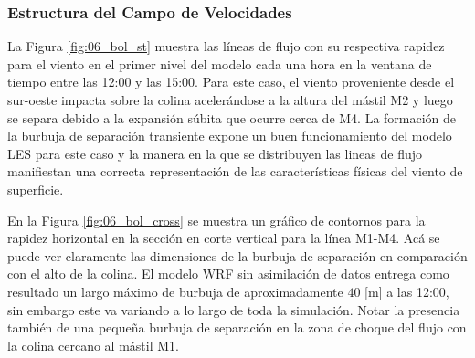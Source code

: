 \subsubsection{Estructura del Campo de Velocidades}
La Figura \ref{fig:06_bol_st} muestra las líneas de flujo con su respectiva rapidez para el viento en el primer nivel del modelo cada una hora en la ventana de tiempo entre las 12:00 y las 15:00. Para este caso, el viento proveniente desde el sur-oeste impacta sobre la colina acelerándose a la altura del mástil M2 y luego se separa debido a la expansión súbita que ocurre cerca de M4. La formación de la burbuja de separación transiente expone un buen funcionamiento del modelo LES para este caso y la manera en la que se distribuyen las lineas de flujo manifiestan una correcta representación de las características físicas del viento de superficie.

En la Figura \ref{fig:06_bol_cross} se muestra un gráfico de contornos para la rapidez horizontal en la sección en corte vertical para la línea M1-M4. Acá se puede ver claramente las dimensiones de la burbuja de separación en comparación con el alto de la colina. El modelo WRF sin asimilación de datos entrega como resultado un largo máximo de burbuja de aproximadamente $40$ [m] a las 12:00, sin embargo este va variando a lo largo de toda la simulación. Notar la presencia también de una pequeña burbuja de separación en la zona de choque del flujo con la colina cercano al mástil M1.

